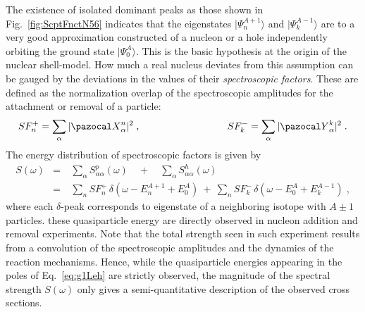 The existence of isolated dominant peaks  as those shown in Fig.~\ref{fig:ScptFnctN56} indicates that the eigenstates $|\Psi^{A+1}_n\rangle$ and $|\Psi^{A-1}_k\rangle$ are to a very good approximation constructed of a nucleon or a hole independently orbiting the ground state $|\Psi^A_0\rangle$. This is the basic hypothesis at the origin of the nuclear shell-model.
 How much a real nucleus deviates from this assumption can be gauged by the deviations in the values of their {\em spectroscopic factors}. These are defined
 as the normalization overlap of the spectroscopic amplitudes for the attachment or removal of a particle:
\begin{eqnarray}
  SF_n^+=   \sum_\alpha  |{\pazocal X}^n_\alpha|^2 \; ,
 \qquad \qquad && \qquad \qquad 
  SF_k^- =  \sum_\alpha  |{\pazocal Y}^k_\alpha|^2 \; .
\label{eq:SFdef}
\end{eqnarray}
The energy distribution of spectroscopic factors is given by
\begin{eqnarray}
  S(\omega) &=& ~ \sum_\alpha S^p_{\alpha \alpha}(\omega) \quad + \quad \sum_\alpha S^h_{\alpha \alpha}(\omega)  \nonumber \\
          &=& ~ \sum_n  SF_n^+ \, \delta( \omega - E^{A+1}_n + E^A_0) 
          ~+~  \sum_n  SF_k^- \, \delta( \omega - E^A_0 + E^{A-1}_k ) \; ,
\label{eq:SFvsE}
\end{eqnarray}
where each $\delta$-peak corresponds to eigenstate of a neighboring isotope with $A\pm1$ particles. these quasiparticle energy are directly observed in nucleon addition and removal experiments.
%
Note that the total strength  seen in such experiment results from a convolution of the spectroscopic amplitudes and the dynamics of the reaction mechanisms. Hence, while the quasiparticle energies appearing in the poles of Eq.~\eqref{eq:g1Leh} are strictly observed, the magnitude of the spectral strength $S(\omega)$ only gives a semi-quantitative description of the observed cross sections.



